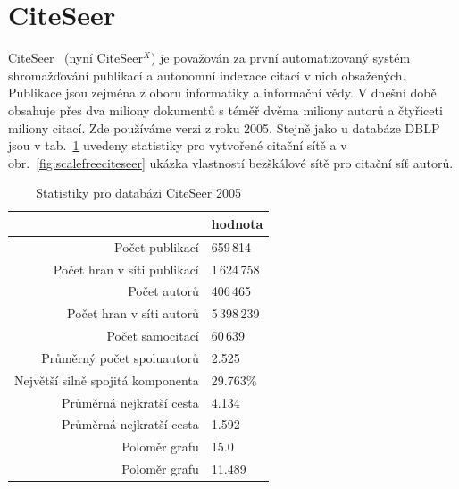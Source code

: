 \documentclass{bakalarka}
\begin{document}
\section{CiteSeer}
CiteSeer~\citet{citeseer} (nyní CiteSeer$^X$) je považován za první
automatizovaný systém shromažďování publikací a autonomní indexace citací v
nich obsažených. Publikace jsou zejména z oboru informatiky a informační vědy.
V dnešní době obsahuje přes dva miliony dokumentů s téměř dvěma miliony autorů
a čtyřiceti miliony citací. Zde používáme verzi z roku 2005.
Stejně jako u databáze DBLP jsou v tab.~\ref{tab:citeseerstat} uvedeny
statistiky pro vytvořené citační sítě a v obr.~\ref{fig:scalefreeciteseer}
ukázka vlastností bezškálové sítě pro citační síť autorů.

\begin{table}[!ht]
\centering
\caption{Statistiky pro databázi CiteSeer 2005}
\label{tab:citeseerstat}
\begin{tabular}{r|l}
\toprule
& hodnota \\
\midrule
Počet publikací & 659\,814 \\
Počet hran v síti publikací & 1\,624\,758 \\
Počet autorů & 406\,465 \\
Počet hran v síti autorů & 5\,398\,239 \\
Počet samocitací & 60\,639 \\
Průměrný počet spoluautorů & 2.525 \\
Největší silně spojitá komponenta & 29.763\% \\
Průměrná nejkratší cesta\footnotemark[1] & 4.134 \\
Průměrná nejkratší cesta\footnotemark[2] & 1.592 \\
Poloměr grafu\footnotemark[1] & 15.0   \\
Poloměr grafu\footnotemark[2] & 11.489 \\
\bottomrule
\end{tabular}
\end{table}
\end{document}
